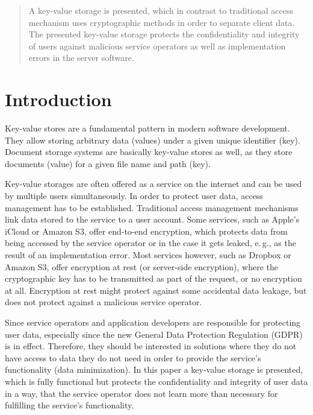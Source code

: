 \begin{abstract}
	A key-value storage is presented, which in contrast to traditional access mechanism uses cryptographic methods in order to separate client data.
	The presented key-value storage protects the confidentiality and integrity of users against malicious service operators as well as implementation errors in the server software.
\end{abstract}

\section{Introduction}
Key-value stores are a fundamental pattern in modern software development.
They allow storing arbitrary data (values) under a given unique identifier (key).
Document storage systems are basically key-value stores as well, as they store documents (value) for a given file name and path (key).

Key-value storages are often offered as a service on the internet and can be used by multiple users simultaneously.
In order to protect user data, access management has to be established.
Traditional access management mechanisms link data stored to the service to a user account.
Some services, such as Apple's iCloud or Amazon S3, offer end-to-end encryption, which protects data from being accessed by the service operator or in the case it gets leaked, e.\,g., as the result of an implementation error.
Most services however, such as Dropbox or Amazon S3, offer encryption at rest (or server-side encryption), where the cryptographic key has to be transmitted as part of the request, or no encryption at all.
Encryption at rest might protect against some accidental data leakage, but does not protect against a malicious service operator.

Since service operators and application developers are responsible for protecting user data, especially since the new General Data Protection Regulation (GDPR) is in effect.
Therefore, they should be interested in solutions where they do not have access to data they do not need in order to provide the service's functionality (data minimization).
In this paper a key-value storage is presented, which is fully functional but protects the confidentiality and integrity of user data in a way, that the service operator does not learn more than necessary for fulfilling the service's functionality.

